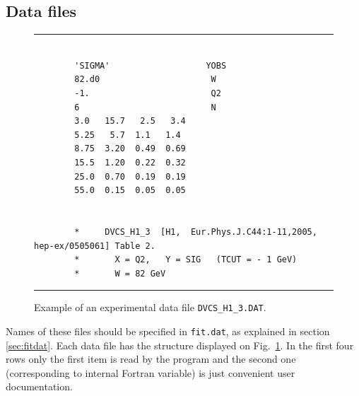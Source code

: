 \documentclass[12pt]{article}
\begin{document}
\subsection{Data files\label{sec:datafiles}}

\begin{figure}[t]
\begin{center}
\hrule
\begin{verbatim}

        'SIGMA'                   YOBS
        82.d0                      W
        -1.                        Q2
        6                          N
        3.0   15.7   2.5   3.4   
        5.25   5.7  1.1   1.4  
        8.75  3.20  0.49  0.69
        15.5  1.20  0.22  0.32
        25.0  0.70  0.19  0.19
        55.0  0.15  0.05  0.05


        *     DVCS_H1_3  [H1,  Eur.Phys.J.C44:1-11,2005, hep-ex/0505061] Table 2.
        *       X = Q2,   Y = SIG   (TCUT = - 1 GeV)
        *       W = 82 GeV

\end{verbatim}
\hrule
\end{center}
\caption{Example of an experimental data file \texttt{DVCS\_H1\_3.DAT}.}
\label{fig:DVCS4.DAT}
\end{figure}

Names of these files should be specified in \texttt{fit.dat}, as explained
in section \ref{sec:fitdat}.
Each data file has the structure displayed on Fig.~\ref{fig:DVCS4.DAT}. In the first
four rows only the first item is read by the program and the second one
(corresponding to internal Fortran variable) is just convenient user
documentation.
\end{document}

